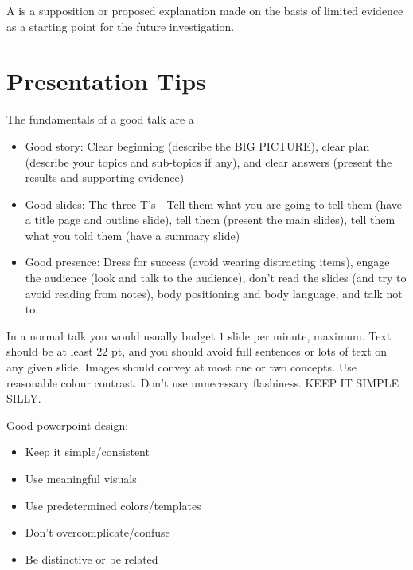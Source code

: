 \documentclass[12pt, a4paper, oneside, openright, titlepage]{book}
\begin{document}
\begin{appendices}
    \begin{defn}
        A  is a supposition or proposed explanation made on the basis of limited evidence as a starting point for the future investigation.
    \end{defn}







    \section{Presentation Tips}

    The fundamentals of a good talk are a\begin{itemize}
        \item Good story: Clear beginning (describe the BIG PICTURE), clear plan (describe your topics and sub-topics if any), and clear answers (present the results and supporting evidence)
        \item Good slides: The three T's - Tell them what you are going to tell them (have a title page and outline slide), tell them (present the main slides), tell them what you told them (have a summary slide)
        \item Good presence: Dress for success (avoid wearing distracting items), engage the audience (look and talk to the audience), don't read the slides (and try to avoid reading from notes), body positioning and body language, and talk  not to.
    \end{itemize}

    In a normal talk you would usually budget $1$ slide per minute, maximum. Text should be at least $22$ pt, and you should avoid full sentences or lots of text on any given slide. Images should convey at most one or two concepts. Use reasonable colour contrast. Don't use unnecessary flashiness. KEEP IT SIMPLE SILLY.

    Good powerpoint design:

    \begin{itemize}
        \item Keep it simple/consistent
        \item Use meaningful visuals
        \item Use predetermined colors/templates
        \item Don't overcomplicate/confuse
        \item Be distinctive or be related
    \end{itemize}


\end{appendices}
\end{document}
